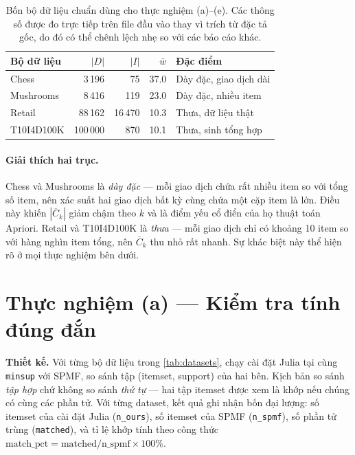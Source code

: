 \begin{table}[htbp]
    \centering
    \caption{Bốn bộ dữ liệu chuẩn dùng cho thực nghiệm (a)--(e). Các thông số được đo trực tiếp trên file đầu vào thay vì trích từ đặc tả gốc, do đó có thể chênh lệch nhẹ so với các báo cáo khác.}
    \label{tab:datasets}
    \begin{tabular}{l|r|r|r|l}
        \hline
        \textbf{Bộ dữ liệu} & $|D|$ & $|I|$ & $\bar{w}$ & \textbf{Đặc điểm} \\ \hline
        Chess       & 3\,196   & 75      & 37.0 & Dày đặc, giao dịch dài \\
        Mushrooms   & 8\,416   & 119     & 23.0 & Dày đặc, nhiều item \\
        Retail      & 88\,162  & 16\,470 & 10.3 & Thưa, dữ liệu thật \\
        T10I4D100K  & 100\,000 & 870     & 10.1 & Thưa, sinh tổng hợp \\
        \hline
    \end{tabular}
\end{table}

\paragraph{Giải thích hai trục.} Chess và Mushrooms là \emph{dày đặc} --- mỗi giao dịch chứa rất nhiều item so với tổng số item, nên xác suất hai giao dịch bất kỳ cùng chứa một cặp item là lớn. Điều này khiến $|\overline{C}_k|$ giảm chậm theo $k$ và là điểm yếu cổ điển của họ thuật toán Apriori. Retail và T10I4D100K là \emph{thưa} --- mỗi giao dịch chỉ có khoảng 10 item so với hàng nghìn item tổng, nên $\overline{C}_k$ thu nhỏ rất nhanh. Sự khác biệt này thể hiện rõ ở mọi thực nghiệm bên dưới.

\section{Thực nghiệm (a) --- Kiểm tra tính đúng đắn}
\label{sec:exp-a}

\textbf{Thiết kế.} Với từng bộ dữ liệu trong \autoref{tab:datasets}, chạy cài đặt Julia tại cùng \texttt{minsup} với SPMF, so sánh tập (itemset, support) của hai bên. Kịch bản so sánh \emph{tập hợp} chứ không so sánh \emph{thứ tự} --- hai tập itemset được xem là khớp nếu chúng có cùng các phần tử. Với từng dataset, kết quả ghi nhận bốn đại lượng: số itemset của cài đặt Julia (\texttt{n\_ours}), số itemset của SPMF (\texttt{n\_spmf}), số phần tử trùng (\texttt{matched}), và tỉ lệ khớp tính theo công thức $\text{match\_pct} = \text{matched} / \text{n\_spmf} \times 100\%$.

